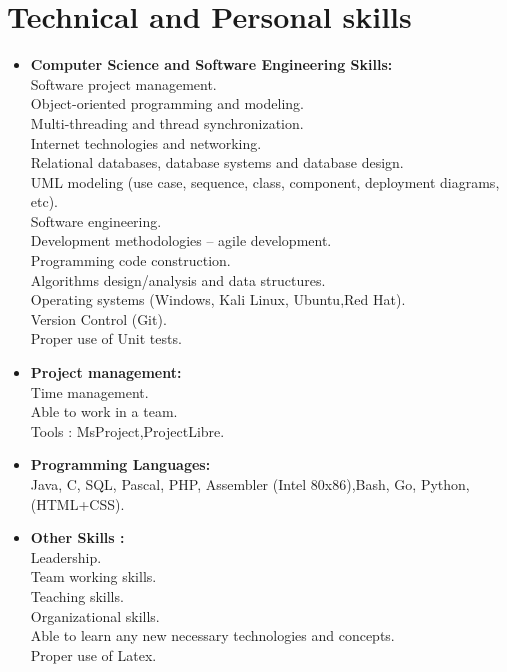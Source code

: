 \documentclass[12pt,a4paper,sans]{moderncv}
\begin{document}
	\section{Technical and Personal skills}
	\vspace{1.5 ex}
	\begin{itemize}
		
		\item \textbf{Computer Science and Software Engineering Skills:}
		\vspace{2ex}
		\\
		Software project management.\\
		Object-oriented programming and modeling.\\
		Multi-threading and thread synchronization.\\
		Internet technologies and networking.\\
		Relational databases, database systems and database design.\\
		UML modeling (use case, sequence, class, component, deployment diagrams, etc).\\
		Software engineering.\\
		Development methodologies – agile development.\\
		Programming code construction.\\
		Algorithms design/analysis and data structures.\\
		Operating systems  (Windows, Kali Linux, Ubuntu,Red Hat). \\
		Version Control (Git).\\
		Proper use of Unit tests. 
		\vspace{3pt}
		\item \textbf{Project management:}
		\vspace{3ex}\\
		Time management.\\
		Able to work in a team.\\
		Tools : MsProject,ProjectLibre.
		\vspace{3ex}
		\item \textbf{Programming Languages:}
		\vspace{3ex}
		\\ Java,  C, SQL, Pascal, PHP,  Assembler (Intel 80x86),Bash, Go, Python,(HTML+CSS).
		\vspace{3ex}
		\item \textbf{	Other Skills :} 
		\vspace{3ex}
		\\
		Leadership.\\
		Team working skills.\\
		Teaching skills.\\
		Organizational skills.\\
		Able to learn any new necessary technologies and concepts.\\
		Proper use of Latex. 
		
	\end{itemize}
\end{document}
